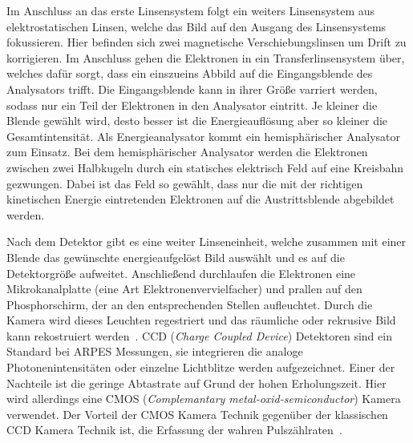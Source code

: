         Im Anschluss an das erste Linsensystem folgt ein weiters Linsensystem aus elektrostatischen Linsen, welche das Bild auf den Ausgang des Linsensystems fokussieren.
        Hier befinden sich zwei magnetische Verschiebungslinsen um Drift zu korrigieren.
        Im Anschluss gehen die Elektronen in ein Transferlinsensystem über, welches dafür sorgt, dass ein einszueins Abbild auf die Eingangsblende des Analysators trifft.
        Die Eingangsblende kann in ihrer Größe varriert werden, sodass nur ein Teil der Elektronen in den Analysator eintritt.
        Je kleiner die Blende gewählt wird, desto besser ist die Energieauflösung aber so kleiner die Gesamtintensität.
        Als Energieanalysator kommt ein hemisphärischer Analysator zum Einsatz.
        Bei dem hemisphärischer Analysator werden die Elektronen zwischen zwei Halbkugeln durch ein statisches elektrisch Feld auf eine Kreisbahn gezwungen.
        Dabei ist das Feld so gewählt, dass nur die mit der richtigen kinetischen Energie eintretenden Elektronen auf die Austrittsblende abgebildet werden.
        
        Nach dem Detektor gibt es eine weiter Linseneinheit, welche zusammen mit einer Blende das gewünschte energieaufgelöst Bild auswählt und es auf die Detektorgröße aufweitet.
        Anschließend durchlaufen die Elektronen eine Mikrokanalplatte (eine Art Elektronenvervielfacher) und prallen auf den Phosphorschirm, der an den entsprechenden Stellen aufleuchtet.
        Durch die Kamera wird dieses Leuchten regestriert und das räumliche oder rekrusive Bild kann rekostruiert werden~\cite{SPECS-MM}.
        CCD (\textit{Charge Coupled Device}) Detektoren sind ein Standard bei ARPES Messungen, sie integrieren die analoge Photonenintensitäten oder einzelne Lichtblitze werden aufgezeichnet.
        Einer der Nachteile ist die geringe Abtastrate auf Grund der hohen Erholungszeit.
        Hier wird allerdings eine CMOS (\textit{Complemantary metal-oxid-semiconductor}) Kamera verwendet.
        Der Vorteil der CMOS Kamera Technik gegenüber der klassischen CCD  Kamera Technik ist, die Erfassung der wahren Pulszählraten~\cite{CMOS}.
        
